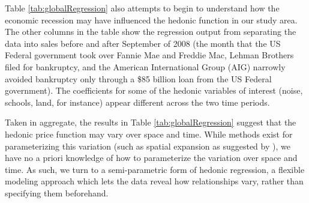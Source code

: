 \documentclass{article}\usepackage{graphicx, color}
\begin{document}
Table \ref{tab:globalRegression} also attempts to begin to understand how the economic recession may have influenced the hedonic function in our study area. The other columns in the table show the regression output from separating the data into sales before and after September of 2008 (the month that the US Federal government took over Fannie Mae and Freddie Mac, Lehman Brothers filed for bankruptcy, and the American International Group (AIG) narrowly avoided bankruptcy only through a \$85 billion loan from the US Federal government). The coefficients for some of the hedonic variables of interest (noise, schools, land, for instance) appear different across the two time periods.

Taken in aggregate, the results in Table \ref{tab:globalRegression} suggest that the hedonic price function may vary over space and time. While methods exist for parameterizing this variation (such as spatial expansion as suggested by \citet{Casetti1974}), we have no a priori knowledge of how to parameterize the variation over space and time. As such, we turn to a semi-parametric form of hedonic regression, a flexible modeling approach which lets the data reveal how relationships vary, rather than specifying them beforehand.
\end{document}
